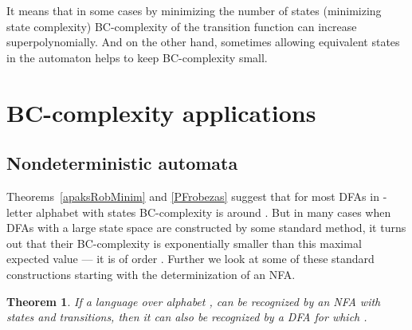 \documentclass[copyright, creativecommons]{eptcs}
\newtheorem{theorem}{Theorem}[section]
\begin{document}
It means that in some cases by minimizing the number of states
(minimizing state complexity) BC-complexity
of the transition function can increase superpolynomially. And on the other hand, sometimes allowing equivalent states
in the automaton helps to keep BC-complexity small. 


\section{BC-complexity applications}
\subsection{Nondeterministic automata}
Theorems~\ref{apaksRobMinim} and \ref{PFrobezas} suggest that for most DFAs in -letter alphabet with  states BC-complexity is around . But in many cases when DFAs with a large state space
are constructed by some standard method, it turns out that their BC-complexity is exponentially smaller
than this maximal expected value --- it is of order . Further we look at some of these
standard constructions starting with the determinization of an NFA.

\begin{theorem}
\label{nedetTrans}
If a language  over alphabet ,  can be recognized by an NFA  with  states
and  transitions,
then it can also be recognized
by a DFA  for which
.
\end{theorem}
\end{document}
